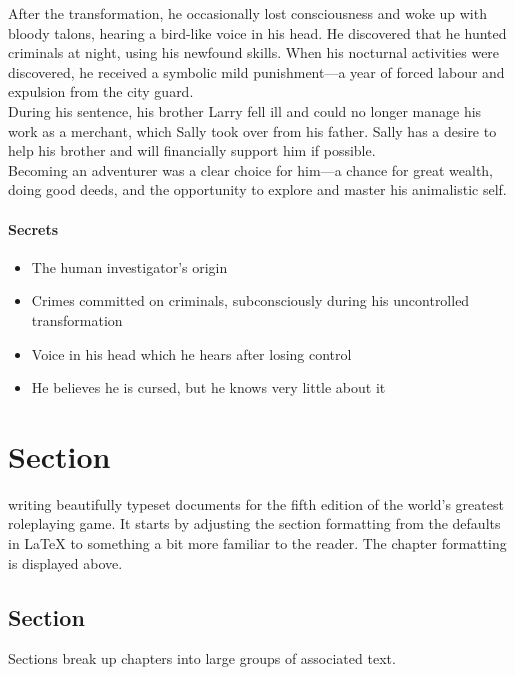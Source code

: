 \documentclass[10pt,twocolumn,twoside,openany,bg=full,layout=true,nomultitoc]{dndbook}
\begin{document}
After the transformation, he occasionally lost consciousness and woke up with bloody talons,
hearing a bird-like voice in his head.
He discovered that he hunted criminals at night, using his newfound skills.
When his nocturnal activities were discovered, he received a symbolic mild punishment—a year of forced labour and
expulsion from the city guard.\\

During his sentence, his brother Larry fell ill and could no longer manage his work as a merchant,
which Sally took over from his father.
Sally has a desire to help his brother and will financially support him if possible.\\

Becoming an adventurer was a clear choice for him—a chance for great wealth, doing good deeds, and the opportunity to
explore and master his animalistic self.\\

\subsubsection{Secrets}
\begin{itemize}
  \item The human investigator's origin
  \item Crimes committed on criminals, subconsciously during his uncontrolled transformation
  \item Voice in his head which he hears after losing control
  \item He believes he is cursed, but he knows very little about it
\end{itemize}


\newpage

\twocolumn

\chapter{Section}

 writing beautifully typeset documents for the fifth edition of the world's greatest roleplaying game. It starts by adjusting the section formatting from the defaults in \LaTeX{} to something a bit more familiar to the reader. The chapter formatting is displayed above.

\section{Section}
Sections break up chapters into large groups of associated text.
\end{document}

